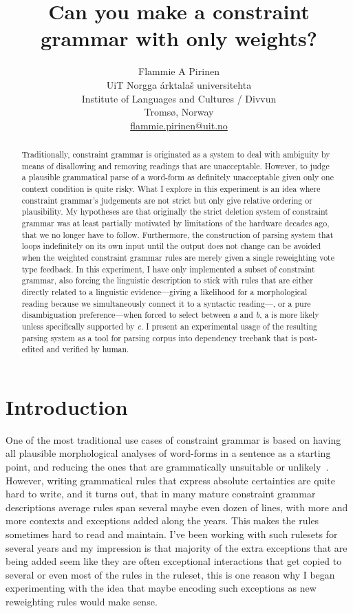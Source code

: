 \documentclass[free]{flammie}
\title{Can you make a constraint grammar with only weights?}
\author{Flammie A Pirinen \\
  UiT Norgga árktalaš universitehta \\
  Institute of Languages and Cultures / Divvun \\
  Tromsø, Norway\\
  \url{flammie.pirinen@uit.no}}
\date{}
\begin{document}
\maketitle
\begin{abstract}
    Traditionally, constraint grammar is originated as a system to deal with
    ambiguity by means of disallowing and removing readings that are
    unacceptable.  However, to judge a plausible grammatical parse of a
    word-form as definitely unacceptable given only one context condition is
    quite risky.  What I explore in this experiment is an idea where constraint
    grammar's judgements are not strict but only give relative ordering or
    plausibility.  My hypotheses are that originally the strict deletion system
    of constraint grammar was at least partially motivated by limitations of the
    hardware decades ago, that we no longer have to follow.  Furthermore, the
    construction of parsing system that loops indefinitely on its own input
    until the output does not change can be avoided when the weighted constraint
    grammar rules are merely given a single reweighting vote type feedback.  In
    this experiment, I have only implemented a subset of constraint grammar,
    also forcing the linguistic description to stick with rules that are either
    directly related to a linguistic evidence---giving a likelihood for a
    morphological reading because we simultaneously connect it to a syntactic
    reading---, or a pure disambiguation preference---when forced to select
    between \textit{a} and \textit{b}, a is more likely unless specifically
    supported by \textit{c}.  I present an experimental usage of the resulting
    parsing system as a tool for parsing corpus into dependency treebank that is
    post-edited and verified by human.
\end{abstract}



\section{Introduction}

One of the most traditional use cases of constraint grammar is based on having
all plausible morphological analyses of word-forms in a sentence as a starting
point, and reducing the ones that are grammatically unsuitable or
unlikely~\cite{karlsson1990constraint}.  However, writing grammatical rules that
express absolute certainties are quite hard to write, and it turns out, that in
many mature constraint grammar descriptions average rules span several maybe
even dozen of lines, with more and more contexts and exceptions added along the
years.  This makes the rules sometimes hard to read and maintain.  I've been
working with such rulesets for several years and my impression is that majority
of the extra exceptions that are being added seem like they are often
exceptional interactions that get copied to several or even most of the rules in
the ruleset, this is one reason why I began experimenting with the idea that
maybe encoding such exceptions as new reweighting rules would make sense.
\end{document}
